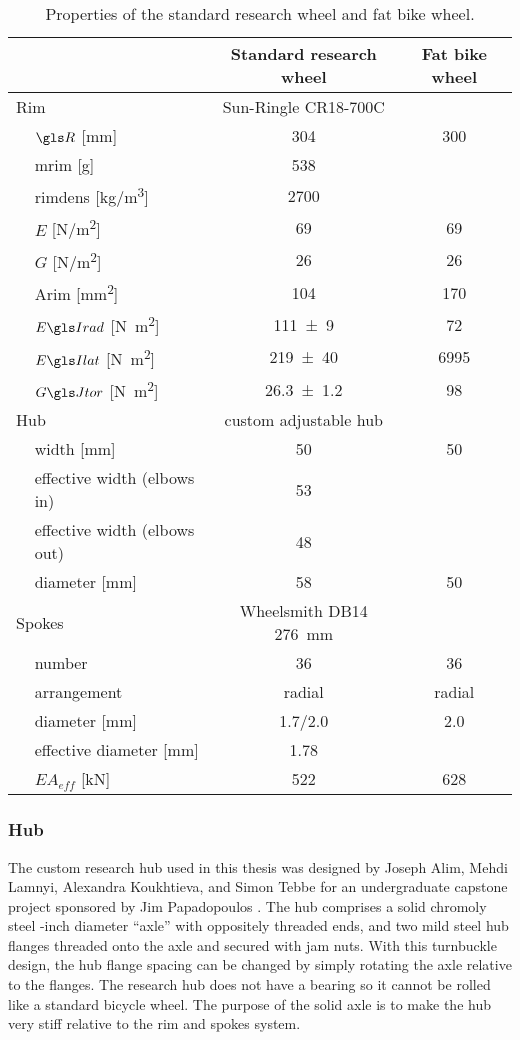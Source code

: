 \documentclass[../../thesis.tex]{subfiles}
\begin{document}
\begin{table}
\caption[Wheel properties]{Properties of the standard research wheel and fat bike wheel.}
\label{tab:standard_wheels}
\begin{tabular}{llcc}
\toprule
&& \textbf{Standard research wheel} & \textbf{Fat bike wheel}\\
\midrule
\multicolumn{2}{l}{Rim}& Sun-Ringle CR18-700C\\
\,& $\R$ [\si{mm}]         & \num{304} & 300\\
\,& \gls{mrim} [\si{g}]    & \num{538}\\
\,& \gls{rimdens} [\si{kg/m^3}] & \num{2700}\\
\,& $E$ [\si{N/m^2}]       & \num{69}        & \num{69}\\
\,& $G$ [\si{N/m^2}]       & \num{26}        & \num{26}\\
\,& \gls{Arim} [\si{mm^2}] & \num{104}       & \num{170}\\
\,& $\EIr$ [\si{N.m^2}]    & \num{111+-9}    & \num{72}\\
\,& $\EIl$ [\si{N.m^2}]    & \num{219+-40}   & \num{6995}\\
\,& $\GJ$   [\si{N.m^2}]   & \num{26.3+-1.2} & \num{98}\\
\multicolumn{2}{l}{Hub} & custom adjustable hub\\
\,& width [\si{mm}]              & 50 & 50\\
\,& effective width (elbows in)  & 53\\
\,& effective width (elbows out) & 48\\
\,& diameter [\si{mm}]           & 58 & 50\\
\multicolumn{2}{l}{Spokes} & Wheelsmith DB14 \SI{276}{mm}\\
\,& number                 & 36      & 36\\
\,& arrangement            & radial  & radial\\
\,& diameter [\si{mm}]     & 1.7/2.0 & 2.0\\
\,& effective diameter [\si{mm}]     & 1.78\\
\,& $EA_{eff}$ [\si{kN}]   & 522     & 628\\
\bottomrule
\end{tabular}
\end{table}

\subsubsection*{Hub}
The custom research hub used in this thesis was designed by Joseph Alim, Mehdi Lamnyi, Alexandra Koukhtieva, and Simon Tebbe for an undergraduate capstone project sponsored by Jim Papadopoulos \cite{Alim2016}. The hub comprises a solid chromoly steel -inch diameter ``axle'' with oppositely threaded ends, and two mild steel hub flanges threaded onto the axle and secured with jam nuts. With this turnbuckle design, the hub flange spacing can be changed by simply rotating the axle relative to the flanges. The research hub does not have a bearing so it cannot be rolled like a standard bicycle wheel. The purpose of the solid axle is to make the hub very stiff relative to the rim and spokes system.
\end{document}
